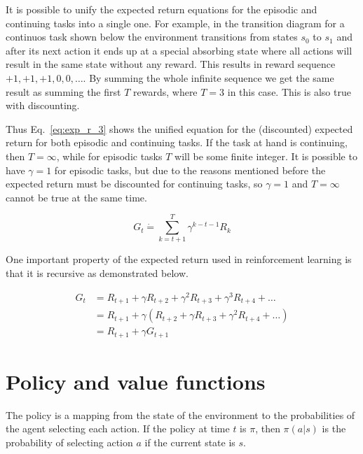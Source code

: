 
It is possible to unify the expected return equations for the episodic and continuing tasks into a single one. For example, in the transition diagram for a continuos task shown below the environment transitions from states $s_0$ to $s_1$ and after its next action it ends up at a special absorbing state where all actions will result in the same state without any reward. This results in reward sequence $+1, +1, +1, 0, 0, \ldots$. By summing the whole infinite sequence we get the same result as summing the first $T$ rewards, where $T=3$ in this case. This is also true with discounting. 

Thus Eq.~\ref{eq:exp_r_3} shows the unified equation for the (discounted) expected return for both episodic and continuing tasks. If the task at hand is continuing, then $T=\infty$, while for episodic tasks $T$ will be some finite integer. It is possible to have $\gamma=1$ for episodic tasks, but due to the reasons mentioned before the expected return must be discounted for continuing tasks, so $\gamma=1$ and $T=\infty$ cannot be true at the same time.

\begin{equation}
  G_t \dot{=} \sum_{k=t+1}^{T}\gamma^{k-t-1}R_{k}
  \label{eq:exp_r_3}
\end{equation}

One important property of the expected return used in reinforcement learning is that it is recursive as demonstrated below.

\begin{equation}
  \begin{aligned}
    G_t &= R_{t+1} + \gamma R_{t+2} + \gamma^2 R_{t+3} + \gamma^3 R_{t+4} + \ldots\\ 
        &= R_{t+1} + \gamma\left(R_{t+2} + \gamma R_{t+3} + \gamma^2 R_{t+4} + \ldots  \right )\\ 
        &= R_{t+1} + \gamma G_{t+1}
   \end{aligned}
\end{equation}

\section{Policy and value functions}
The policy is a mapping from the state of the environment to the probabilities of the agent selecting each action. If the policy at time $t$ is $\pi$, then $\pi(a|s)$ is the probability of selecting action $a$ if the current state is $s$.

